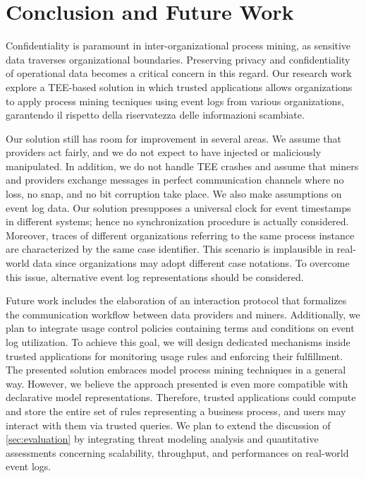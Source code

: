 \section{Conclusion and Future Work}
\label{sec:conclusion}
Confidentiality is paramount in inter-organizational process mining, as sensitive data traverses organizational boundaries. Preserving privacy and confidentiality of operational data becomes a critical concern in this regard. Our research work explore a TEE-based solution in which trusted applications allows organizations to apply process mining tecniques using event logs from various organizations, garantendo il rispetto della riservatezza delle informazioni scambiate.

Our solution still has room for improvement in several areas. We assume that providers act fairly, and we do not expect to have injected or maliciously manipulated. In addition, we do not handle TEE crashes and assume that miners and providers exchange messages in perfect communication channels where no loss, no snap, and no bit corruption take place. We also make assumptions on event log data. Our solution presupposes a universal clock for event timestamps in different systems; hence no synchronization procedure is actually considered. Moreover, traces of different organizations referring to the same process instance are characterized by the same case identifier. This scenario is implausible in real-world data since organizations may adopt different case notations. To overcome this issue, alternative event log representations should be considered.

Future work includes the elaboration of an interaction protocol that formalizes the communication workflow between data providers and miners. Additionally, we plan to integrate usage control policies containing terms and conditions on event log utilization. To achieve this goal, we will design dedicated mechanisms inside trusted applications for monitoring usage rules and enforcing their fulfillment. The presented solution embraces model process mining techniques in a general way. However, we believe the approach presented is even more compatible with declarative model representations. Therefore, trusted applications could compute and store the entire set of rules representing a business process, and users may interact with them via trusted queries. We plan to extend the discussion of \cref{sec:evaluation} by integrating threat modeling analysis and quantitative assessments concerning scalability, throughput, and performances on real-world event logs.

